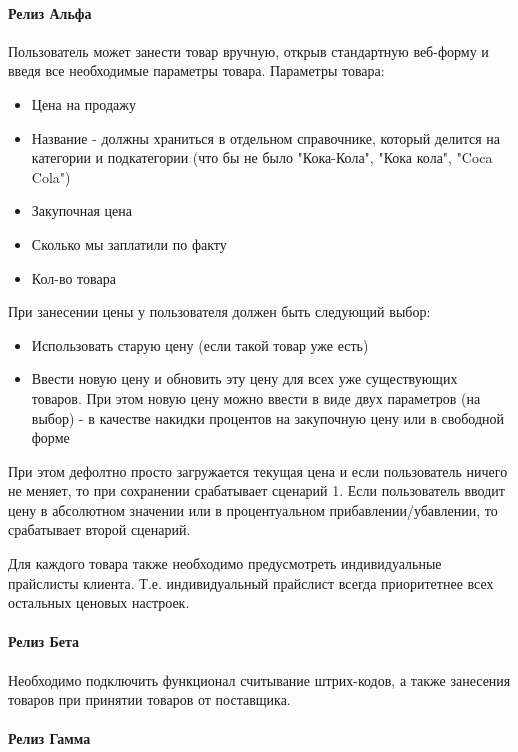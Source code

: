 \documentclass[DIV=calc, paper=a4, fontsize=11pt]{scrartcl} %
\begin{document}
\paragraph{Релиз Альфа}
Пользователь может занести товар вручную, открыв стандартную веб-форму и введя все необходимые параметры товара.
Параметры товара:
\begin{itemize}
	\item Цена на продажу
	\item Название - должны храниться в отдельном справочнике, который делится на категории и подкатегории (что бы не было "Кока-Кола", "Кока кола", "Coca Cola")
	\item Закупочная цена
	\item Сколько мы заплатили по факту
	\item Кол-во товара
\end{itemize}
При занесении цены у пользователя должен быть следующий выбор:
\begin{itemize}
	\item Использовать старую цену (если такой товар уже есть)
	\item Ввести новую цену и обновить эту цену для всех уже существующих товаров. При этом новую цену можно ввести в виде двух параметров (на выбор) - в качестве накидки процентов на закупочную цену или в свободной форме 
\end{itemize}
При этом дефолтно просто загружается текущая цена и если пользователь ничего не меняет, то при сохранении срабатывает сценарий 1. Если пользователь вводит цену в абсолютном значении или в процентуальном прибавлении/убавлении, то срабатывает второй сценарий.

Для каждого товара также необходимо предусмотреть индивидуальные прайслисты клиента. Т.е. индивидуальный прайслист всегда приоритетнее всех остальных ценовых настроек.
\paragraph{Релиз Бета}
Необходимо подключить функционал считывание штрих-кодов, а также занесения товаров при принятии товаров от поставщика.

\paragraph{Релиз Гамма}
\end{document}
